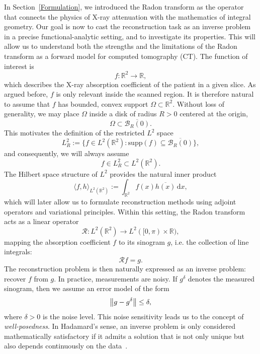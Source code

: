 \documentclass[12pt,a4paper]{article}
\begin{document}
In Section~\ref{Formulation}, we introduced the Radon transform as the operator that connects the physics of X-ray attenuation with the mathematics of integral geometry. Our goal is now to cast the reconstruction task as an inverse problem in a precise functional-analytic setting, and to investigate its properties. This will allow us to understand both the strengths and the limitations of the Radon transform as a forward model for computed tomography (CT).
\newline\newline
The function of interest is  
\[
f : \mathbb{R}^2 \to \mathbb{R},
\]  
which describes the X-ray absorption coefficient of the patient in a given slice. As argued before, $f$ is only relevant inside the scanned region. It is therefore natural to assume that $f$ has bounded, convex support $\Omega \subset \mathbb{R}^2$. Without loss of generality, we may place $\Omega$ inside a disk of radius $R > 0$ centered at the origin,  
\[
\Omega \subset \overline{\mathcal B_R (0)}.
\]  
This motivates the definition of the restricted $L^2$ space  
\[
L^2_{R} := \{ f \in L^2(\mathbb R^2) : \mathrm{supp}(f) \subseteq \overline{\mathcal B_R (0)} \},
\]  
and consequently, we will always assume  
\[
f \in L^2_R \subset L^2(\mathbb R^2).
\]  
The Hilbert space structure of $L^2$ provides the natural inner product  
\[
\langle f, h \rangle_{L^2(\mathbb R^2)} := \int_{\mathbb R^2} f(x) \overline{h(x)} \,\mathrm{d}x,
\]  
which will later allow us to formulate reconstruction methods using adjoint operators and variational principles.
\newline\newline
Within this setting, the Radon transform acts as a linear operator  
\[
\mathcal{R} : L^2(\mathbb R^2) \to L^2([0,\pi) \times \mathbb R),
\]  
mapping the absorption coefficient $f$ to its sinogram $g$, i.e. the collection of line integrals:  
\[
\mathcal{R} f = g.
\]  
The reconstruction problem is then naturally expressed as an inverse problem: recover $f$ from $g$.  In practice, measurements are noisy. If $g^\delta$ denotes the measured sinogram, then we assume an error model of the form  
\[
\norm{g - g^\delta} \leq \delta,
\]  
where $\delta > 0$ is the noise level. This noise sensitivity leads us to the concept of \emph{well-posedness}. In Hadamard’s sense, an inverse problem is only considered mathematically satisfactory if it admits a solution that is not only unique but also depends continuously on the data~\cite{math_of_ct_wald}.
\end{document}
